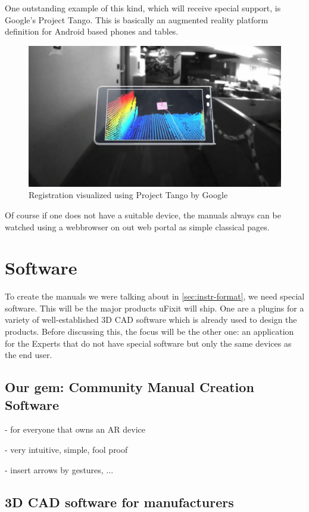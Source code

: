 		One outstanding example of this kind, which will receive special support, is Google's Project Tango. This is basically an augmented reality platform definition for Android based phones and tables.
		
		\begin{figure}[H]
			\centering
			\includegraphics[width=0.7\linewidth]{../images/project-tango}
			\caption{Registration visualized using Project Tango by Google}
			\label{fig:project-tango}
		\end{figure}
		
		Of course if one does not have a suitable device, the manuals always can be watched using a webbrowser on out web portal as simple classical pages.
		
	
	\section{Software}
	
		To create the manuals we were talking about in \eqref{sec:instr-format}, we need special software. This will be the major products uFixit will ship. One are a plugins for a variety of well-established 3D CAD software which is already used to design the products. Before discussing this, the focus will be the other one: an application for the Experts that do not have special software but only the same devices as the end user.
	
		\subsection{Our gem: Community Manual Creation Software}
		
			- for everyone that owns an AR device
			
			- very intuitive, simple, fool proof
			
			- insert arrows by gestures, ...
	
		\subsection{3D CAD software for manufacturers}
		

